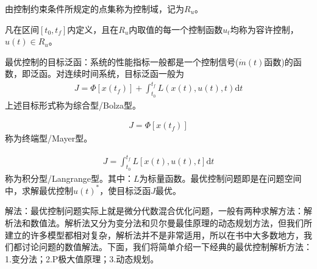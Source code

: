             由控制约束条件所规定的点集称为控制域，记为$ R_u$。
            \par
            凡在区间$[t_0,t_f]$内定义，且在$R_u$内取值的每一个控制函数$u_t$均称为容许控制，$u(t)\in R_u$。
            \par
            最优控制的目标泛函：系统的性能指标一般都是一个控制信号($\dot{m}(t)$函数)的函数，即泛函。对连续时间系统，目标泛函一般为
            \begin{align*}
            J = \Phi[x(t_f)] +\int_{t_0}^{t_f}L(x(t),u(t),t)\mathrm{d}t
            \end{align*}
            上述目标形式称为综合型/Bolza型。
            \par
            \begin{align*}
            J = \Phi[x(t_f)]
            \end{align*}
            称为终端型/Mayer型。
            \par
            \begin{align*}
            J = \int_{t_0}^{t_f} L[x(t),u(t),t]\mathrm{d}t
            \end{align*}
            称为积分型/Langrange型。其中：$L$为标量函数。最优控制问题即是在问题空间中，求解最优控制$u(t)^*$，使目标泛函$J$最优。
            \par
            解法：最优控制问题实际上就是微分代数混合优化问题，一般有两种求解方法：解析法和数值法。解析法又分为变分法和贝尔曼最佳原理的动态规划方法，但我们所建立的许多模型都相对复杂，解析法并不是非常适用，所以在书中大多数地方，我们都讨论问题的数值解法。下面，我们将简单介绍一下经典的最优控制解析方法：1.变分法；2.P极大值原理；3.动态规划。

